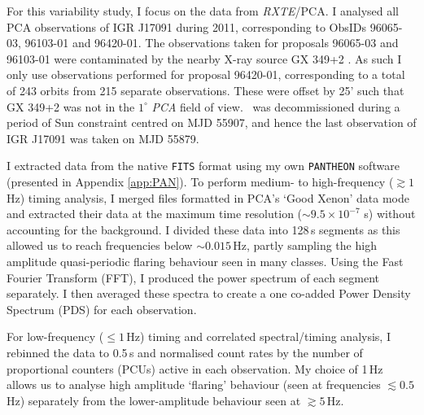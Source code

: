 \par For this variability study, I focus on the data from \textit{RXTE}/PCA.  I analysed all PCA observations of IGR J17091 during 2011, corresponding to ObsIDs 96065-03, 96103-01 and 96420-01.  The observations taken for proposals 96065-03 and 96103-01 were contaminated by the nearby X-ray source GX 349+2 \citep{Altamirano_IGR_FH,Rodriguez_Contamination}.  As such I only use observations performed for proposal 96420-01, corresponding to a total of 243 orbits from 215 separate observations.  These were offset by 25' such that GX 349+2 was not in the $1^\circ$ \textit{PCA} field of view.  \rxte\ was decommissioned during a period of Sun constraint centred on MJD 55907,  and hence the last observation of IGR J17091 was taken on MJD 55879.
\par I extracted data from the native \texttt{FITS} format using my own \texttt{PANTHEON} software (presented in Appendix \ref{app:PAN}).  To perform medium- to high-frequency ($\gtrsim1$\,Hz) timing analysis, I merged files formatted in PCA's `Good Xenon' data mode and extracted their data at the maximum time resolution ($\sim9.5\times10^{-7}$ s) without accounting for the background.  I divided these data into 128\,s segments as this allowed us to reach frequencies below $\sim0.015$\,Hz, partly sampling the high amplitude quasi-periodic flaring behaviour seen in many classes.  Using the Fast Fourier Transform (FFT), I produced the power spectrum of each segment separately.  I then averaged these spectra to create a one co-added Power Density Spectrum (PDS) for each observation.
\par For low-frequency ($\leq1$\,Hz) timing and correlated spectral/timing analysis, I rebinned the data to 0.5\,s and normalised count rates by the number of proportional counters (PCUs) active in each observation.  My choice of 1\,Hz allows us to analyse high amplitude `flaring' behaviour (seen at frequencies $\lesssim0.5$\,Hz) separately from the lower-amplitude behaviour seen at $\gtrsim5$\,Hz.
